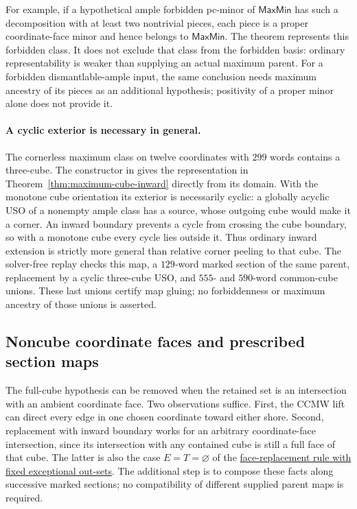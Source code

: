 For example, if a hypothetical ample forbidden pc-minor of
$\mathsf{MaxMin}$ has such a decomposition with at least two nontrivial
pieces, each piece is a proper coordinate-face minor and hence belongs
to $\mathsf{MaxMin}$. The theorem represents this forbidden class.
It does not exclude that class from the forbidden basis: ordinary
representability is weaker than supplying an actual maximum parent.
For a forbidden dismantlable-ample input, the same conclusion needs
maximum ancestry of its pieces as an additional hypothesis; positivity
of a proper minor alone does not provide it.

\paragraph{A cyclic exterior is necessary in general.}
The cornerless maximum class on twelve coordinates with $299$ words
contains a three-cube. The constructor in
 gives the representation
in Theorem~\ref{thm:maximum-cube-inward} directly from its domain.
With the monotone cube orientation its exterior is necessarily cyclic:
a globally acyclic USO of a nonempty ample class has a source, whose
outgoing cube would make it a corner. An inward boundary prevents a
cycle from crossing the cube boundary, so with a monotone cube every
cycle lies outside it. Thus ordinary inward extension is strictly
more general than relative corner peeling to that cube.
The solver-free replay checks this map, a $129$-word marked section of
the same parent, replacement by a cyclic three-cube USO, and $555$- and
$590$-word common-cube unions. These last unions certify map gluing;
no forbiddenness or maximum ancestry of those unions is asserted.

\subsection{Noncube coordinate faces and prescribed section maps}
\label{sec:maximum-noncube-face-inward}

The full-cube hypothesis can be removed when the retained set is an
intersection with an ambient coordinate face. Two observations suffice.
First, the CCMW lift can direct every edge in one chosen coordinate
toward either shore. Second, replacement with inward boundary works for
an arbitrary coordinate-face intersection, since its intersection with
any contained cube is still a full face of that cube. The latter is
also the case $E=T=\varnothing$ of the
\href{../dismantlable-ample/sections/classification/coupled_face_replacement.tex}
{face-replacement rule with fixed exceptional out-sets}.
The additional step is to compose these facts along successive marked
sections; no compatibility of different supplied parent maps is required.

